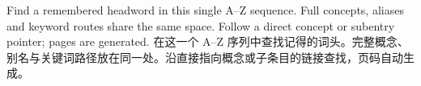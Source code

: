 \documentclass[10pt,twoside]{article}
\begin{document}
 {Find a remembered headword in this single A--Z sequence. Full concepts, aliases and keyword routes share the same space. Follow a direct concept or subentry pointer; pages are generated.}
 {在这一个 A--Z 序列中查找记得的词头。完整概念、别名与关键词路径放在同一处。沿直接指向概念或子条目的链接查找，页码自动生成。}
\StudyPrintQuickReference
\end{document}
